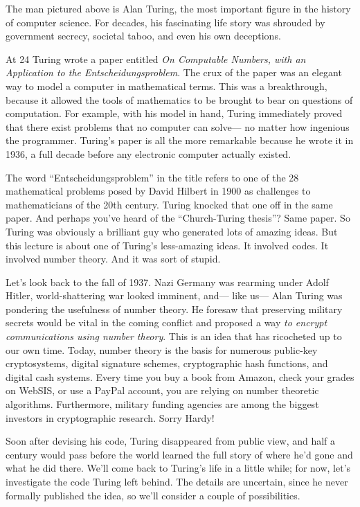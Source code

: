 The man pictured above is Alan Turing, the most important figure in
the history of computer science.  For decades, his fascinating life
story was shrouded by government secrecy, societal taboo, and even his
own deceptions.

At 24 Turing wrote a paper entitled \textit{On Computable Numbers, with an
Application to the Entscheidungsproblem}.  The crux of the paper was an
elegant way to model a computer in mathematical terms.  This was a
breakthrough, because it allowed the tools of mathematics to be brought to
bear on questions of computation.  For example, with his model in hand,
Turing immediately proved that there exist problems that no computer can
solve--- no matter how ingenious the programmer.  Turing's paper is all the
more remarkable because he wrote it in 1936, a full decade before any
electronic computer actually existed.

The word ``Entscheidungsproblem'' in the title refers to one of the 28
mathematical problems posed by David Hilbert in 1900 as challenges to
mathematicians of the 20th century.  Turing knocked that one off in
the same paper.  And perhaps you've heard of the ``Church-Turing
thesis''?  Same paper.  So Turing was obviously a brilliant guy who
generated lots of amazing ideas.  But this lecture is about one of
Turing's less-amazing ideas.  It involved codes.  It involved number
theory.  And it was sort of stupid.


Let's look back to the fall of 1937.  Nazi Germany was rearming under
Adolf Hitler, world-shattering war looked imminent, and--- like us--- Alan
Turing was pondering the usefulness of number theory.  He foresaw that
preserving military secrets would be vital in the coming conflict and
proposed a way \textit{to encrypt communications using number theory}.
This is an idea that has ricocheted up to our own time.  Today, number
theory is the basis for numerous public-key cryptosystems, digital
signature schemes, cryptographic hash functions, and digital cash systems.
Every time you buy a book from Amazon, check your grades on WebSIS, or use
a PayPal account, you are relying on number theoretic algorithms.
Furthermore, military funding agencies are among the biggest investors in
cryptographic research.  Sorry Hardy!

Soon after devising his code, Turing disappeared from public view, and
half a century would pass before the world learned the full story of
where he'd gone and what he did there.  We'll come back to Turing's
life in a little while; for now, let's investigate the code Turing
left behind.  The details are uncertain, since he never formally
published the idea, so we'll consider a couple of possibilities.

